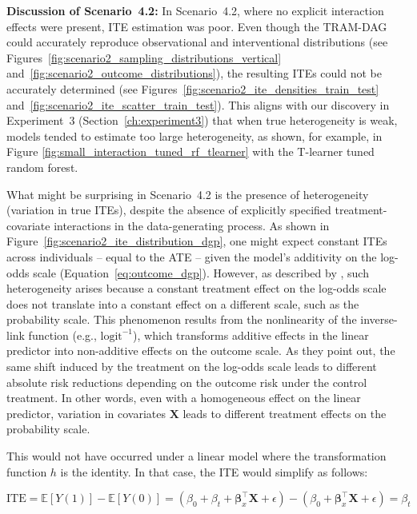 \FloatBarrier

\textbf{Discussion of Scenario~4.2:} In Scenario~4.2, where no explicit interaction effects were present, ITE estimation was poor. Even though the TRAM-DAG could accurately reproduce observational and interventional distributions (see Figures~\ref{fig:scenario2_sampling_distributions_vertical} and~\ref{fig:scenario2_outcome_distributions}), the resulting ITEs could not be accurately determined (see Figures~\ref{fig:scenario2_ite_densities_train_test} and~\ref{fig:scenario2_ite_scatter_train_test}). This aligns with our discovery in Experiment~3 (Section~\ref{ch:experiment3}) that when true heterogeneity is weak, models tended to estimate too large heterogeneity, as shown, for example, in Figure \ref{fig:small_interaction_tuned_rf_tlearner} with the T-learner tuned random forest.

\medskip

What might be surprising in Scenario~4.2 is the presence of heterogeneity (variation in true ITEs), despite the absence of explicitly specified treatment-covariate interactions in the data-generating process. As shown in Figure~\ref{fig:scenario2_ite_distribution_dgp}, one might expect constant ITEs across individuals -- equal to the ATE -- given the model's additivity on the log-odds scale (Equation~\ref{eq:outcome_dgp}). However, as described by \citet{hoogland2021}, such heterogeneity arises because a constant treatment effect on the log-odds scale does not translate into a constant effect on a different scale, such as the probability scale. This phenomenon results from the nonlinearity of the inverse-link function (e.g., $\text{logit}^{-1}$), which transforms additive effects in the linear predictor into non-additive effects on the outcome scale. As they point out, the same shift induced by the treatment on the log-odds scale leads to different absolute risk reductions depending on the outcome risk under the control treatment. In other words, even with a homogeneous effect on the linear predictor, variation in covariates $\mathbf{X}$ leads to different treatment effects on the probability scale.

This would not have occurred under a linear model where the transformation function $h$ is the identity. In that case, the ITE would simplify as follows:

\begin{equation}
\text{ITE} = \mathbb{E}[Y(1)] - \mathbb{E}[Y(0)] = (\beta_0 + \beta_t + \boldsymbol{\beta}_x^\top \mathbf{X} + \epsilon) - (\beta_0 + \boldsymbol{\beta}_x^\top \mathbf{X} + \epsilon) = \beta_t
\label{eq:ITE_LM}
\end{equation}

